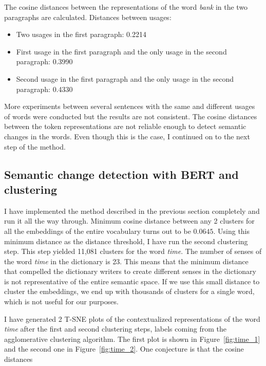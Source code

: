 \documentclass[11pt]{article}
\begin{document}
The cosine distances between the representations of the word \textit{bank} in the two paragraphs are calculated.
Distances between usages:
\begin{itemize}
  \item Two usages in the first paragraph: 0.2214
  \item First usage in the first paragraph and the only usage in the second paragraph: 0.3990
  \item Second usage in the first paragraph and the only usage in the second paragraph: 0.4330
\end{itemize}

More experiments between several sentences with the same and different usages of words were conducted but the results are not consistent.
The cosine distances between the token representations are not reliable enough to detect semantic changes in the words.
Even though this is the case, I continued on to the next step of the method.

\subsection{Semantic change detection with BERT and clustering}

I have implemented the method described in the previous section completely and run it all the way through.
Minimum cosine distance between any 2 clusters for all the embeddings of the entire vocabulary turns out to be $0.0645$.
Using this minimum distance as the distance threshold, I have run the second clustering step.
This step yielded 11,081 clusters for the word \textit{time}.
The number of senses of the word \textit{time} in the dictionary is 23.
This means that the minimum distance that compelled the dictionary writers to create different senses in the dictionary is not representative of the entire semantic space.
If we use this small distance to cluster the embeddings, we end up with thousands of clusters for a single word, which is not useful for our purposes.

I have generated 2 T-SNE plots of the contextualized representations of the word \textit{time} after the first and second clustering steps, labels coming from the agglomerative clustering algorithm.
The first plot is shown in Figure~\ref{fig:time_1} and the second one in Figure~\ref{fig:time_2}.
One conjecture is that the cosine distances 
\end{document}

